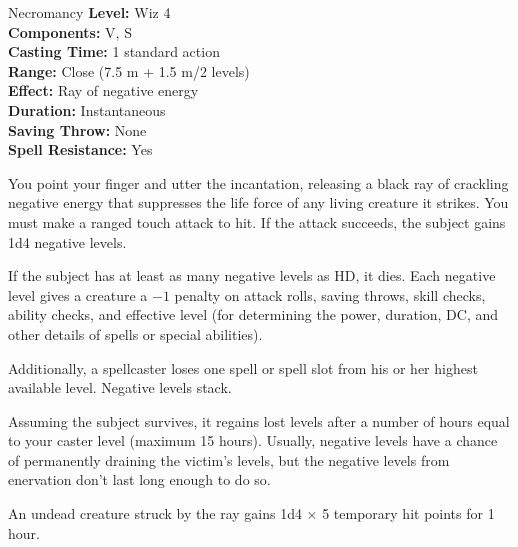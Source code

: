 {Necromancy}
{
	\textbf{Level:}
	Wiz 4\\
	\textbf{Components:}
	V, S\\
	\textbf{Casting Time:}
	1 standard action\\
	\textbf{Range:}
	Close (7.5 m + 1.5 m/2 levels)\\
	\textbf{Effect:}
	Ray of negative energy\\
	\textbf{Duration:}
	Instantaneous\\
	\textbf{Saving Throw:}
	None\\
	\textbf{Spell Resistance:}
	Yes\\
}
{
	You point your finger and utter the incantation, releasing a black ray of crackling negative energy that suppresses the life force of any living creature it strikes. You must make a ranged touch attack to hit. If the attack succeeds, the subject gains 1d4 negative levels.

	If the subject has at least as many negative levels as HD, it dies. Each negative level gives a creature a $-1$ penalty on attack rolls, saving throws, skill checks, ability checks, and effective level (for determining the power, duration, DC, and other details of spells or special abilities).

	Additionally, a spellcaster loses one spell or spell slot from his or her highest available level. Negative levels stack.

	Assuming the subject survives, it regains lost levels after a number of hours equal to your caster level (maximum 15 hours). Usually, negative levels have a chance of permanently draining the victim's levels, but the negative levels from enervation don't last long enough to do so.

	An undead creature struck by the ray gains 1d4 $\times$ 5 temporary hit points for 1 hour.

}
